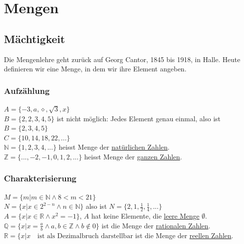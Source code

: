 \documentclass{report}
\begin{document}
\chapter{Mengen}
\section{Mächtigkeit}
Die Mengenlehre geht zurück auf Georg Cantor, 1845 bis 1918, in Halle. Heute definieren wir eine Menge, in dem wir ihre Element angeben.
\subsection{Aufzählung}
$A = \{ -3, a, \diamond, \sqrt{3}, x\}$\\
$B = \{2, 2, 3, 4, 5\}$ ist nicht möglich: Jedes Element genau einmal, also ist $B = \{2, 3, 4, 5\}$\\
$C = \{10, 14, 18, 22, ...\}$\\
$\mathbb{N} = \{1, 2, 3, 4, ... \}$ heisst Menge der \underline{natürlichen Zahlen}.\\
$\mathbb{Z} = \{..., -2, -1, 0, 1, 2, ...\}$ heisst Menge der \underline{ganzen Zahlen}.\\
\subsection{Charakterisierung}
$M = \{ m | m \in \mathbb{N} \land 8 < m < 21\}$\\
$N = \{ x | x \in 2^{2-n} \land n \in \mathbb{N}\}$ also ist $N = \{2, 1, \frac{1}{2}, \frac{1}{4}, ...\}$\\
$A= \{x | x \in \mathbb{R} \land x^2 = -1\}$, $A$ hat keine Elemente, die \underline{leere Menge} $\emptyset$.\\
$\mathbb{Q} = \{x | x = \frac{a}{b} \land a,b \in \mathbb{Z} \land b \not \in 0\}$ ist die Menge der \underline{rationalen Zahlen}.\\
$\mathbb{R} = \{ x | x \quad \mbox{ist als Dezimalbruch darstellbar}$ ist die Menge der \underline{reellen Zahlen}.
\end{document}
